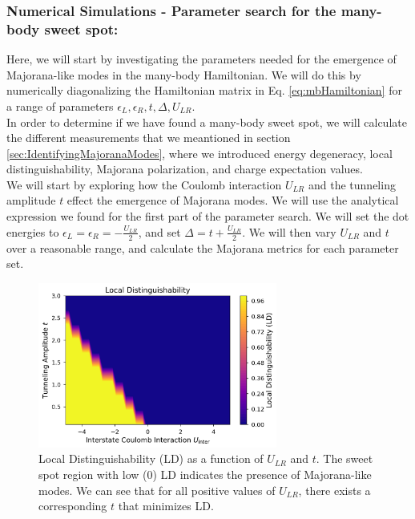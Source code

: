 \documentclass[11pt, letterpaper, titlepage]{article}
\begin{document}
\subsubsection{Numerical Simulations - Parameter search for the many-body sweet spot:}
Here, we will start by investigating the parameters needed for the emergence of Majorana-like modes in the many-body Hamiltonian. We will do this by numerically diagonalizing the Hamiltonian matrix in Eq. \ref{eq:mbHamiltonian} for a range of parameters $ϵ_L, ϵ_R, t, Δ, U_{LR}$.\\
In order to determine if we have found a many-body sweet spot, we will calculate the different measurements that we meantioned in section \ref{sec:IdentifyingMajoranaModes}, where we introduced energy degeneracy, local distinguishability, Majorana polarization, and charge expectation values.\\
We will start by exploring how the Coulomb interaction $U_{LR}$ and the tunneling amplitude $t$ effect the emergence of Majorana modes. We will use the analytical expression we found for the first part of the parameter search. We will set the dot energies to $ϵ_L = ϵ_R = -\frac{U_{LR}}{2}$, and set $Δ = t + \frac{U_{LR}}{2}$. We will then vary $U_{LR}$ and $t$ over a reasonable range, and calculate the Majorana metrics for each parameter set.\\
\begin{figure}[htbp]
  \centering
  \includegraphics[width=0.7\textwidth]{../Figures/LD_mb.png}
  \caption{Local Distinguishability (LD) as a function of $U_{LR}$ and $t$. The sweet spot region with low (0) LD indicates the presence of Majorana-like modes. We can see that for all positive values of $U_{LR}$, there exists a corresponding $t$ that minimizes LD.}
  \label{fig:mb_LD}
\end{figure}
\end{document}
